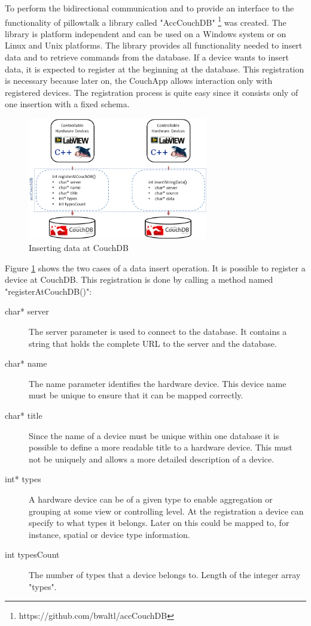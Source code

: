 To perform the bidirectional communication and to provide an interface to the functionality of pillowtalk a library called "AccCouchDB" \footnote{https://github.com/bwaltl/accCouchDB} was created. The library is platform independent and can be used on a Windows system or on Linux and Unix platforms. The library provides all functionality needed to insert data and to retrieve commands from the database. If a device wants to insert data, it is expected to register at the beginning at the database. This registration is necessary because later on, the CouchApp allows interaction only with registered devices. The registration process is quite easy since it consists only of one insertion with a fixed schema.

\begin{figure}[h!]
  \centering
      \includegraphics[width=0.7\textwidth]{images/SendingData2CouchDB.png}
  \caption{Inserting data at CouchDB}
  \label{figure:InsertingData}
\end{figure}

Figure \ref{figure:InsertingData} shows the two cases of a data insert operation. It is possible to register a device at CouchDB. This registration is done by calling a method named "registerAtCouchDB()":
\begin{description}
\item[char* server] The server parameter is used to connect to the database. It contains a string that holds the complete URL to the server and the database.
\item[char* name] The name parameter identifies the hardware device. This device name must be unique to ensure that it can be mapped correctly. 
\item[char* title] Since the name of a device must be unique within one database it is possible to define a more readable title to a hardware device. This must not be uniquely and allows a more detailed description of a device.
\item[int* types] A hardware device can be of a given type to enable aggregation or grouping at some view or controlling level. At the registration a device can specify to what types it belongs. Later on this could be mapped to, for instance, spatial or device type information.
\item[int typesCount] The number of types that a device belongs to. Length of the integer array "types".
\end{description}

